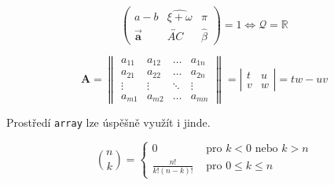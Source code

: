 \documentclass[twocolumn,11pt]{article}
\theoremstyle{definition}
\begin{document}
$$
\left(\begin{array}{ccc}
a-b & \widehat{\xi+\omega} & \pi \\
\vec{\mathbf{a}} & \overleftrightarrow{A C} & \hat{\beta}
\end{array}\right)=1 \Longleftrightarrow \mathcal{Q}=\mathbb{R}
$$


$$
\mathbf{A}=\left\|\begin{array}{cccc}
a_{11} & a_{12} & \ldots & a_{1 n} \\
a_{21} & a_{22} & \ldots & a_{2 n} \\
\vdots & \vdots & \ddots & \vdots \\
a_{m 1} & a_{m 2} & \ldots & a_{m n}
\end{array}\right\|=\left|\begin{array}{cc}
t & u \\
v & w
\end{array}\right|=t w-u v
$$

Prostředí \texttt{array} lze úspěšně využít i jinde.

$$
\binom{n}{k}=\left\{\begin{array}{cl}
0 & \text { pro } k<0 \text { nebo } k>n \\
\frac{n !}{k !(n-k) !} & \text { pro } 0 \leq k \leq n
\end{array}\right.
$$
\end{document}
